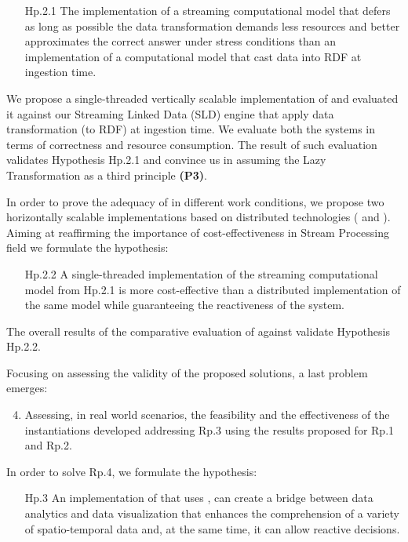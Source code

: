 \begin{itemize}[leftmargin=42pt]
\item[\textsf{Hp.2.1}] The implementation of a streaming computational model that defers as long as possible the data transformation demands less resources and better approximates the correct answer under stress conditions than an implementation of a computational model that cast data into RDF at ingestion time.
\end{itemize}

We propose \sti{} a single-threaded vertically scalable implementation of \river{} and evaluated it against our Streaming Linked Data (SLD) engine that  apply data transformation (to RDF) at ingestion time.
We evaluate both the systems in terms of correctness and resource consumption.
The result of such evaluation validates Hypothesis \textsf{Hp.2.1} and convince us in assuming the \textsf{Lazy Transformation} as a third principle \textbf{(P3)}.

In order to prove the adequacy of \river{} in different work conditions, we propose two horizontally scalable implementations based on distributed technologies (\sparkdi{} and \hivedi{}).
Aiming at reaffirming the importance of cost-effectiveness in Stream Processing field we formulate the hypothesis:

\begin{itemize}[leftmargin=42pt]
\item[\textsf{Hp.2.2}] A single-threaded implementation of the streaming computational model from \textsf{Hp.2.1} is more cost-effective than a distributed implementation of the same model while guaranteeing the reactiveness of the system.
\end{itemize}

The overall results of the comparative evaluation of \sti{} against \sparkdi{} validate Hypothesis \textsf{Hp.2.2}.

Focusing on assessing the validity of the proposed solutions, a last problem emerges:
\begin{enumerate}[leftmargin=32pt,label=\textsf{Rp.\arabic*}]
\setcounter{enumi}{3}
\item Assessing, in real world scenarios, the feasibility and the effectiveness of the instantiations developed addressing \textsf{Rp.3} using the results proposed for \textsf{Rp.1} and \textsf{Rp.2}.
\end{enumerate}

In order to solve \textsf{Rp.4}, we formulate the hypothesis:
\begin{itemize}[leftmargin=42pt]
\item[\textsf{Hp.3}] An implementation of \river{} that uses \frappe{}, can create a bridge between data analytics and data visualization that enhances the comprehension of a variety of spatio-temporal data and, at the same time, it can allow reactive decisions.
\end{itemize}

